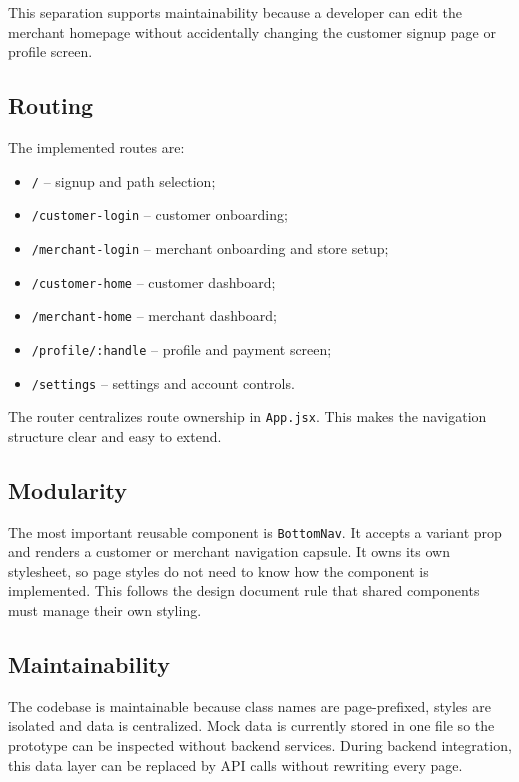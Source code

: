 \documentclass[12pt,a4paper]{article}
\begin{document}
This separation supports maintainability because a developer can edit the merchant homepage without accidentally changing the customer signup page or profile screen.

\subsection{Routing}
The implemented routes are:
\begin{itemize}
    \item \texttt{/} -- signup and path selection;
    \item \texttt{/customer-login} -- customer onboarding;
    \item \texttt{/merchant-login} -- merchant onboarding and store setup;
    \item \texttt{/customer-home} -- customer dashboard;
    \item \texttt{/merchant-home} -- merchant dashboard;
    \item \texttt{/profile/:handle} -- profile and payment screen;
    \item \texttt{/settings} -- settings and account controls.
\end{itemize}

The router centralizes route ownership in \texttt{App.jsx}. This makes the navigation structure clear and easy to extend.

\subsection{Modularity}
The most important reusable component is \texttt{BottomNav}. It accepts a variant prop and renders a customer or merchant navigation capsule. It owns its own stylesheet, so page styles do not need to know how the component is implemented. This follows the design document rule that shared components must manage their own styling.

\subsection{Maintainability}
The codebase is maintainable because class names are page-prefixed, styles are isolated and data is centralized. Mock data is currently stored in one file so the prototype can be inspected without backend services. During backend integration, this data layer can be replaced by API calls without rewriting every page.
\end{document}
